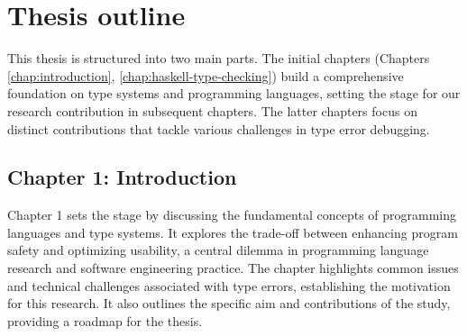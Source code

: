 








\section{Thesis outline}

 This thesis is structured into two main parts. The initial chapters (Chapters \ref{chap:introduction}, \ref{chap:haskell-type-checking}) build a comprehensive foundation on type systems and programming languages, setting the stage for our research contribution in subsequent chapters. The latter chapters focus on distinct contributions that tackle various challenges in type error debugging.

\subsection*{Chapter 1: Introduction}
Chapter 1 sets the stage by discussing the fundamental concepts of programming languages and type systems. It explores the trade-off between enhancing program safety and optimizing usability, a central dilemma in programming language research and software engineering practice. The chapter highlights common issues and technical challenges associated with type errors, establishing the motivation for this research. It also outlines the specific aim and contributions of the study, providing a roadmap for the thesis.

